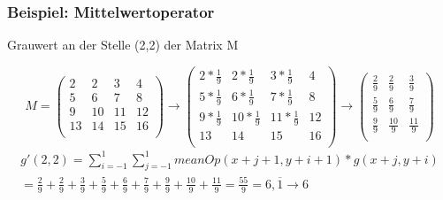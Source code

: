 \documentclass[aspectratio=169]{beamer}
\begin{document}
\begin{frame}
    \frametitle{Beispiel: Mittelwertoperator}
    \begin{alertblock}
        {Grauwert an der Stelle (2,2) der Matrix M}
    \begin{center}
        \begin{equation} M =
            \begin{pmatrix}
                 2 &  2 &  3 &  4\\
                 5 &  6 &  7 &  8\\
                 9 & 10 & 11 & 12\\
                13 & 14 & 15 & 16\\
            \end{pmatrix}
            \rightarrow 
            \begin{pmatrix}
                2*\frac{1}{9} &  2*\frac{1}{9} &  3*\frac{1}{9} &  4\\
                 5*\frac{1}{9} &  6*\frac{1}{9} &  7*\frac{1}{9} &  8\\
                 9*\frac{1}{9} & 10*\frac{1}{9} & 11*\frac{1}{9} & 12\\
                13 & 14 & 15 & 16\\
            \end{pmatrix}
            \rightarrow
            \begin{pmatrix}
                \frac{2}{9} &  \frac{2}{9} &  \frac{3}{9}\\
                \frac{5}{9} &  \frac{6}{9} &  \frac{7}{9}\\
                 \frac{9}{9} & \frac{10}{9} & \frac{11}{9}\\
            \end{pmatrix}
        \end{equation}
        \begin{equation}
        \begin{aligned}
            g'(2,2) =\sum_{i=-1}^{1}\sum_{j=-1}^{1}meanOp(x+j+1,y+i+1)*g(x+j,y+i) \\
            = \frac{2}{9} + \frac{2}{9} + \frac{3}{9} + \frac{5}{9} + \frac{6}{9} + \frac{7}{9} + \frac{9}{9} + \frac{10}{9} + \frac{11}{9} = \frac{55}{9} = 6,\overline{1} \rightarrow 6
        \end{aligned}
        \end{equation}
    \end{center}
    \end{alertblock}
\end{frame}
\end{document}
